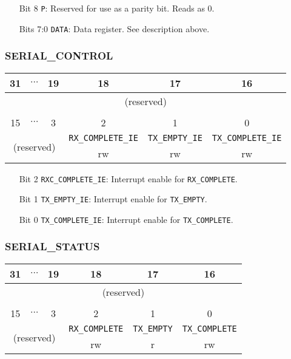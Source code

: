 \documentclass[11pt,openany]{report}
\begin{document}
\begin{enumerate}
\item[Bit 8] \verb|P|: Reserved for use as a parity bit. Reads as 0.
\item[Bits 7:0] \verb|DATA|: Data register. See description above.
\end{enumerate}

\subsubsection{SERIAL\_CONTROL}
\begin{center}
  \begin{tabular}{|c|c|c|c|c|c|}
    \hline
    31 & $\cdots$ & 19 & 18 & 17 & 16  \\
    \hline
    \multicolumn{6}{|c|}{\multirow{2}{*}{(reserved)}}\\
    \multicolumn{6}{|c|}{}\\
    \hline
    \multicolumn{6}{c}{}\\
    \hline
    15 & $\cdots$ & 3 & 2 & 1 & 0 \\
    \hline
    \multicolumn{3}{|c|}{\multirow{2}{*}{(reserved)}} & \texttt{RX\_COMPLETE\_IE} & \texttt{TX\_EMPTY\_IE} & \texttt{TX\_COMPLETE\_IE} \\
    \cline{4-6}
    \multicolumn{3}{|c|}{} & rw & rw & rw\\
    \hline
  \end{tabular}
\end{center}

\begin{enumerate}
\item[Bit 2] \verb|RXC_COMPLETE_IE|: Interrupt enable for \verb|RX_COMPLETE|.
\item[Bit 1] \verb|TX_EMPTY_IE|: Interrupt enable for \verb|TX_EMPTY|.
\item[Bit 0] \verb|TX_COMPLETE_IE|: Interrupt enable for \verb|TX_COMPLETE|.
\end{enumerate}

\subsubsection{SERIAL\_STATUS}
\begin{center}
  \begin{tabular}{|c|c|c|c|c|c|}
    \hline
    31 & $\cdots$ & 19 & 18 & 17 & 16  \\
    \hline
    \multicolumn{6}{|c|}{\multirow{2}{*}{(reserved)}}\\
    \multicolumn{6}{|c|}{}\\
    \hline
    \multicolumn{6}{c}{}\\
    \hline
    15 & $\cdots$ & 3 & 2 & 1 & 0 \\
    \hline
    \multicolumn{3}{|c|}{\multirow{2}{*}{(reserved)}} & \texttt{RX\_COMPLETE} & \texttt{TX\_EMPTY} & \texttt{TX\_COMPLETE} \\
    \cline{4-6}
    \multicolumn{3}{|c|}{} & rw & r & rw\\
    \hline
  \end{tabular}
\end{center}
\end{document}
